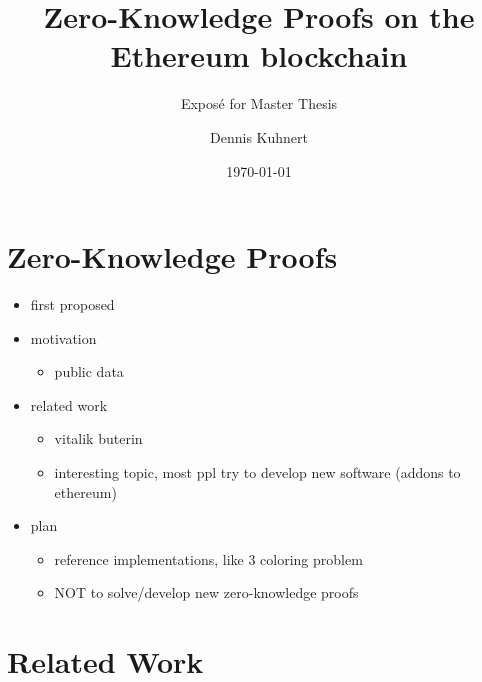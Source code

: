 \documentclass[a4paper]{scrartcl}
\title{Zero-Knowledge Proofs on the Ethereum blockchain}
\subtitle{Exposé for Master Thesis}
\author{Dennis Kuhnert}
\date{\today}
\begin{document}
\maketitle

\section{Zero-Knowledge Proofs}


\begin{itemize}
\item first proposed \cite{goldwasser1989knowledge}
\item motivation
	\begin{itemize}
	\item public data
	\end{itemize}
\item related work
	\begin{itemize}
	\item vitalik buterin \cite{buterin2015public}
	\item interesting topic, most ppl try to develop new software (addons to ethereum)
	\end{itemize}
\item plan
	\begin{itemize}
	\item reference implementations, like 3 coloring problem
	\item NOT to solve/develop new zero-knowledge proofs
	\end{itemize}
\end{itemize}

\section{Related Work}



\end{document}
